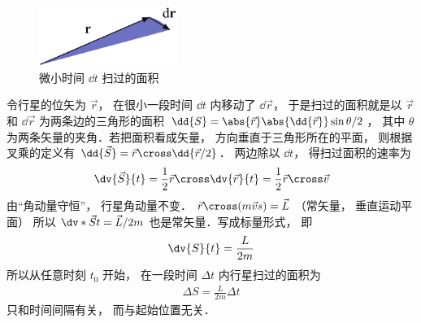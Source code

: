 
\begin{figure}[ht]
\centering
\includegraphics[width=4.5cm]{./figures/Keple21.pdf}
\caption{微小时间 $\dd{t}$ 扫过的面积} \label{Keple21}
\end{figure}

令行星的位矢为 $\vec r$，  在很小一段时间 $\dd{t}$ 内移动了 $\dd{\vec r}$，  于是扫过的面积就是以 $\vec r$ 和 $\dd{\vec r}$ 为两条边的三角形的面积 $\dd{S} = \abs{\vec r} \abs{\dd{\vec r}} \sin \theta /2 $，  其中 $\theta $ 为两条矢量的夹角．若把面积看成矢量， 方向垂直于三角形所在的平面， 则根据叉乘的定义有 $\dd{\vec S} = \vec r \cross \dd{\vec r/2}$． 两边除以 $\dd{t}$，  得扫过面积的速率为
\begin{equation}
\dv{\vec S}{t} = \frac{1}{2}\vec r \cross \dv{\vec r}{t} = \frac 12 \vec r\cross \vec v
\end{equation}
由“角动量守恒”， 行星角动量不变．
$\vec r \cross (m\vec vs) = \vec L$ （常矢量， 垂直运动平面） 所以 $\dv*{\vec S}{t} = \vec L /2m$ 也是常矢量．写成标量形式， 即
\begin{equation}
\dv{S}{t} = \frac{L}{{2m}}
\end{equation}
所以从任意时刻 $t_0$ 开始， 在一段时间 $\Delta t$ 内行星扫过的面积为 
\begin{equation}
\begin{aligned}
\Delta S = \frac{L}{{2m}}\Delta t
\end{aligned}
\end{equation}
只和时间间隔有关， 而与起始位置无关．

